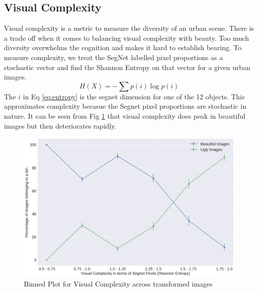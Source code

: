 
\subsection{Visual Complexity }
Visual complexity is a metric to measure the diversity of an urban scene. There is a trade off  when it comes to balancing visual complexity with beauty. Too much diversity overwhelms the cognition and makes it hard to establish bearing. To measure complexity, we treat the SegNet\cite{badrinarayanan2015segnet} labelled pixel proportions as a stochastic vector and find the Shannon Entropy on that vector for a given urban images. 
\begin{equation}
H(X) = -\sum p(i)\log p(i)
\label{eq:entropy} 
\end{equation}
The $i$ in Eq \ref{eq:entropy} is the segnet dimension for one of the 12 objects. This approximates complexity becasue the Segnet pixel proportions are stochastic in nature. It can be seen from Fig \ref{fig:complexity} that visual complexity does peak in beautiful images but then deteriorates rapidly.
\begin{figure}[h]
	\centering
	\includegraphics[width=\columnwidth]{Plot/binnedPlot_complexity.png}
	\caption{Binned Plot for Visual Complexity across transformed images}
	\label{fig:complexity}
\end{figure}







